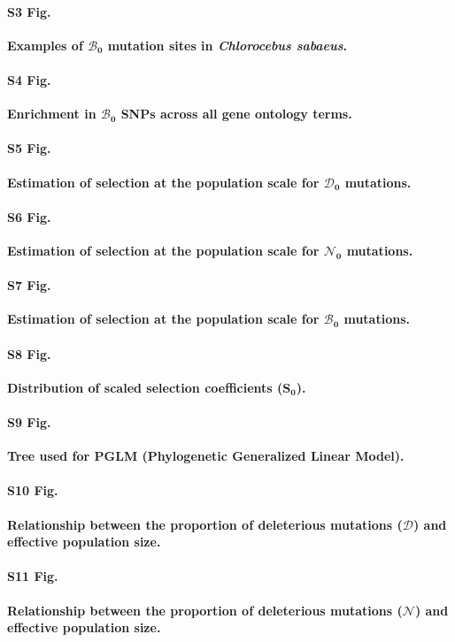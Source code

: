 \documentclass[10pt,letterpaper]{article}
\newcommand{\Sphy}{S_{0}}
\newcommand{\SphyDel}{\mathcal{D}_0}
\newcommand{\SphyNeu}{\mathcal{N}_0}
\newcommand{\SphyBen}{\mathcal{B}_0}
\newcommand{\SpopDel}{\mathcal{D}}
\newcommand{\SpopNeu}{\mathcal{N}}
\begin{document}
\paragraph*{S3 Fig.}
\label{S3_Fig}
{\bf Examples of $\bm{\SphyBen}$ mutation sites in \textit{Chlorocebus sabaeus}.}

\paragraph*{S4 Fig.}
\label{S4_Fig}
{\bf Enrichment in $\bm{\SphyBen}$ SNPs across all gene ontology terms.}

\paragraph*{S5 Fig.}
\label{S5_Fig}
{\bf Estimation of selection at the population scale for $\bm{\SphyDel}$ mutations.}

\paragraph*{S6 Fig.}
\label{S6_Fig}
{\bf Estimation of selection at the population scale for $\bm{\SphyNeu}$ mutations.}

\paragraph*{S7 Fig.}
\label{S7_Fig}
{\bf Estimation of selection at the population scale for $\bm{\SphyBen}$ mutations.}

\paragraph*{S8 Fig.}
\label{S8_Fig}
{\bf Distribution of scaled selection coefficients ($\bm{\Sphy}$).}

\paragraph*{S9 Fig.}
\label{S9_Fig}
{\bf Tree used for PGLM (Phylogenetic Generalized Linear Model).}

\paragraph*{S10 Fig.}
\label{S10_Fig}
{\bf Relationship between the proportion of deleterious mutations ($\bm{\SpopDel}$) and effective population size.}

\paragraph*{S11 Fig.}
\label{S11_Fig}
{\bf Relationship between the proportion of deleterious mutations ($\bm{\SpopNeu}$) and effective population size.}
\end{document}
